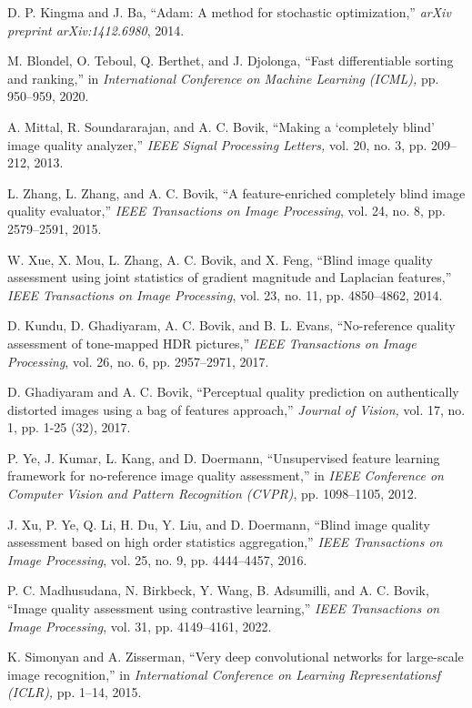 \documentclass[journal]{IEEEtran}
\begin{document}
\begin{thebibliography}{5}
D. P. Kingma and J. Ba, ``Adam: A method for stochastic optimization,'' \emph{arXiv preprint arXiv:1412.6980}, 2014.

M. Blondel, O. Teboul, Q. Berthet, and J. Djolonga, ``Fast differentiable sorting and ranking,'' in \emph{International Conference on Machine Learning (ICML),} pp. 950–959, 2020.

A. Mittal, R. Soundararajan, and A. C. Bovik, ``Making a `completely blind' image quality analyzer,'' \emph{IEEE Signal Processing Letters,} vol. 20, no. 3, pp. 209–212, 2013.

L. Zhang, L. Zhang, and A. C. Bovik, ``A feature-enriched completely blind image quality evaluator,''  \emph{IEEE Transactions on Image Processing}, vol. 24, no. 8, pp. 2579–2591, 2015.

W. Xue, X. Mou, L. Zhang, A. C. Bovik, and X. Feng, ``Blind image quality assessment using joint statistics of gradient magnitude and Laplacian features,'' \emph{IEEE Transactions on Image Processing}, vol. 23, no. 11, pp. 4850–4862, 2014.

D. Kundu, D. Ghadiyaram, A. C. Bovik, and B. L. Evans, ``No-reference quality assessment of tone-mapped HDR pictures,'' \emph{IEEE Transactions on Image Processing}, vol. 26, no. 6, pp. 2957–2971, 2017.

D. Ghadiyaram and A. C. Bovik, ``Perceptual quality prediction on authentically distorted images using a bag of features approach,'' \emph{Journal of Vision,} vol. 17, no. 1, pp. 1-25 (32), 2017.

P. Ye, J. Kumar, L. Kang, and D. Doermann, ``Unsupervised feature learning framework for no-reference image quality assessment,'' in \emph{IEEE Conference on Computer Vision and Pattern Recognition (CVPR)}, pp. 1098–1105, 2012.

J. Xu, P. Ye, Q. Li, H. Du, Y. Liu, and D. Doermann, ``Blind image quality assessment based on high order statistics aggregation,'' \emph{IEEE Transactions on Image Processing}, vol. 25, no. 9, pp. 4444–4457, 2016.

P. C. Madhusudana, N. Birkbeck, Y. Wang, B. Adsumilli, and A. C. Bovik, ``Image quality assessment using contrastive learning,'' \emph{IEEE Transactions on Image Processing}, vol. 31, pp. 4149–4161, 2022.

K. Simonyan and A. Zisserman, ``Very deep convolutional networks for large-scale image recognition,'' in \emph{International Conference on Learning Representationsf (ICLR),} pp. 1–14, 2015.


\end{thebibliography}
\end{document}

